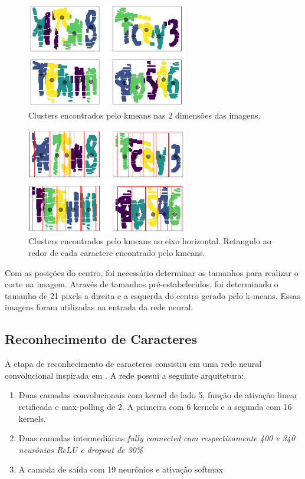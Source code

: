 \documentclass[11pt]{article}
\begin{document}
  \begin{figure}[H]
        {\centering
        \includegraphics[width=70mm]{images/2dkmeans.png}
        \caption{Clusters encontrados pelo kmeans nas 2 dimensões das imagens.}
        \label{fig:kmeans2d}\par}
  \end{figure}

  \begin{figure}[H]
        {\centering
        \includegraphics[width=70mm]{images/1dkmeans.png}
        \caption{Clusters encontrados pelo kmeans no eixo horizontal. Retangulo ao redor de cada caractere encontrado pelo kmeans.}
        \label{fig:kmeans1d}\par}
  \end{figure}

Com as posições do centro, foi necessário determinar os tamanhos para realizar o corte na imagem. Através de tamanhos pré-estabelecidos, foi determinado o tamanho de 21 pixels a direita e a esquerda do centro gerado pelo k-means. Essas imagens foram utilizadas na entrada da rede neural. 

\subsection{Reconhecimento de Caracteres}
\label{ssec:convnet}

A etapa de reconhecimento de caracteres consistiu em uma rede neural convolucional inspirada em \cite{kopp2017}. A rede possui a seguinte arquitetura:

\begin{enumerate}
\item
    Duas camadas convolucionais com kernel de lado 5, função de ativação linear retificada e max-polling de 2. A primeira com 6 kernels e a segunda com 16 kernels.
\item
    Duas camadas intermediárias \em fully connected \em com respectivamente 400 e 340 neurônios ReLU e dropout de 30\%
\item
    A camada de saída com 19 neurônios e ativação softmax
\end{enumerate}
\end{document}
